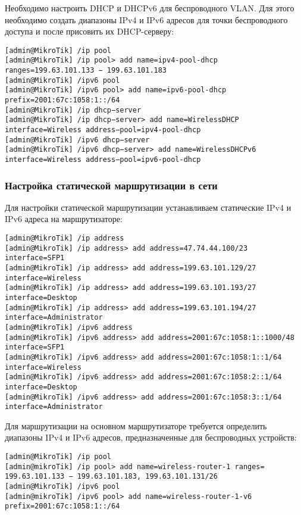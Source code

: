 Необходимо настроить DHCP и DHCPv6 для беспроводного VLAN. Для этого необходимо создать диапазоны IPv4 и IPv6 адресов для точки беспроводного доступа и после присовить их DHCP-серверу:
\begin{lstlisting}
[admin@MikroTik] /ip pool
[admin@MikroTik] /ip pool> add name=ipv4-pool-dhcp ranges=199.63.101.133 − 199.63.101.183
[admin@MikroTik] /ipv6 pool
[admin@MikroTik] /ipv6 pool> add name=ipv6-pool-dhcp prefix=2001:67c:1058:1::/64
[admin@MikroTik] /ip dhcp−server
[admin@MikroTik] /ip dhcp−server> add name=WirelessDHCP interface=Wireless address−pool=ipv4-pool-dhcp 
[admin@MikroTik] /ipv6 dhcp−server
[admin@MikroTik] /ipv6 dhcp−server> add name=WirelessDHCPv6 interface=Wireless address−pool=ipv6-pool-dhcp
\end{lstlisting}

\subsubsection{Настройка статической маршрутизации в сети}

Для настройки статической маршрутизации устанавливаем статические IPv4 и IPv6 адреса на маршрутизаторе:
\begin{lstlisting}
[admin@MikroTik] /ip address
[admin@MikroTik] /ip address> add address=47.74.44.100/23 interface=SFP1
[admin@MikroTik] /ip address> add address=199.63.101.129/27 interface=Wireless
[admin@MikroTik] /ip address> add address=199.63.101.193/27 interface=Desktop
[admin@MikroTik] /ip address> add address=199.63.101.194/27 interface=Administrator
[admin@MikroTik] /ipv6 address
[admin@MikroTik] /ipv6 address> add address=2001:67c:1058:1::1000/48 interface=SFP1
[admin@MikroTik] /ipv6 address> add address=2001:67c:1058:1::1/64 interface=Wireless
[admin@MikroTik] /ipv6 address> add address=2001:67c:1058:2::1/64 interface=Desktop
[admin@MikroTik] /ipv6 address> add address=2001:67c:1058:3::1/64 interface=Administrator
\end{lstlisting}

Для маршрутизации на основном маршрутизаторе требуется определить диапазоны IPv4 и IPv6 адресов, предназначенные для беспроводных устройств:

\begin{lstlisting}
[admin@MikroTik] /ip pool
[admin@mikroTik] /ip pool> add name=wireless-router-1 ranges= 199.63.101.133 − 199.63.101.183, 199.63.101.131/26
[admin@MikroTik] /ipv6 pool
[admin@mikroTik] /ipv6 pool> add name=wireless-router-1-v6 prefix=2001:67c:1058:1::/64
\end{lstlisting}

